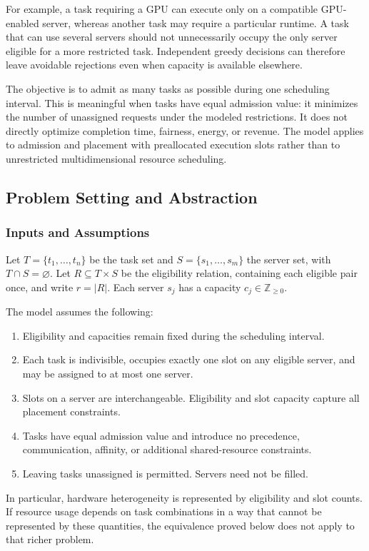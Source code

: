 \documentclass[conference]{IEEEtran}
\theoremstyle{definition}
\theoremstyle{remark}
\begin{document}
For example, a task requiring a GPU can execute only on a compatible
GPU-enabled server, whereas another task may require a particular runtime.
A task that can use several servers should not unnecessarily occupy the
only server eligible for a more restricted task. Independent greedy
decisions can therefore leave avoidable rejections even when capacity is
available elsewhere.

The objective is to admit as many tasks as possible during one scheduling
interval. This is meaningful when tasks have equal admission value: it
minimizes the number of unassigned requests under the modeled restrictions.
It does not directly optimize completion time, fairness, energy, or revenue.
The model applies to admission and placement with preallocated execution
slots rather than to unrestricted multidimensional resource scheduling.

\subsection{Problem Setting and Abstraction}
\subsubsection{Inputs and Assumptions}
Let $T=\{t_1,\ldots,t_n\}$ be the task set and
$S=\{s_1,\ldots,s_m\}$ the server set, with $T\cap S=\varnothing$.
Let $R\subseteq T\times S$ be the eligibility relation, containing each
eligible pair once, and write $r=|R|$. Each server $s_j$ has a capacity
$c_j\in\mathbb{Z}_{\geq0}$.

The model assumes the following:
\begin{enumerate}
\item Eligibility and capacities remain fixed during the scheduling interval.
\item Each task is indivisible, occupies exactly one slot on any eligible
server, and may be assigned to at most one server.
\item Slots on a server are interchangeable. Eligibility and slot capacity
capture all placement constraints.
\item Tasks have equal admission value and introduce no precedence,
communication, affinity, or additional shared-resource constraints.
\item Leaving tasks unassigned is permitted. Servers need not be filled.
\end{enumerate}
In particular, hardware heterogeneity is represented by eligibility and slot
counts. If resource usage depends on task combinations in a way that cannot
be represented by these quantities, the equivalence proved below does not
apply to that richer problem.
\end{document}
